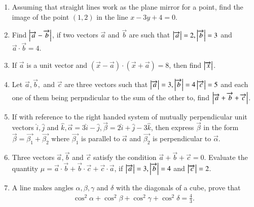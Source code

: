 \begin{enumerate}[label=\thesubsection.\arabic*,ref=\thesubsection.\theenumi]
\item Assuming that straight lines work as the plane mirror for a point, find the image of the point $(1,2)$ in the line $x-3y+4=0$.
\item Find $\left\vert\overrightarrow{a}-\overrightarrow{b}\right\vert$, if two vectors $\overrightarrow{a}$ and $\overrightarrow{b}$ are such that $\left\vert\overrightarrow{a}\right\vert=2, \left\vert\overrightarrow{b}\right\vert=3$ and $\overrightarrow{a} \cdot \overrightarrow{b}=4$.
\item If $\overrightarrow{a}$ is a unit vector and $(\overrightarrow{x}-\overrightarrow{a}) \cdot (\overrightarrow{x}+\overrightarrow{a})=8$, then find $\left\vert\overrightarrow{x}\right\vert$.
\item Let $\overrightarrow{a}, \overrightarrow{b},$ and $ \overrightarrow{c}$ are three vectors such that $\left\vert\overrightarrow{a}\right\vert=3, \left\vert\overrightarrow{b}\right\vert=4 \left\vert\overrightarrow{c}\right\vert=5$ and each one of them being perpndicular to the sum of the other to, find $\left\vert\overrightarrow{a}+\overrightarrow{b}+\overrightarrow{c}\right\vert$.
\item If with reference to the right handed system of mutually perpendicular unit vectors $\hat{i},\hat{j}$ and $\hat{k}, \overrightarrow{\alpha} = 3\hat{i} -\hat{j}, \overrightarrow{\beta}= 2\hat{i} +\hat{j} -3\hat{k}$, then express $\overrightarrow{\beta}$ in the form $\overrightarrow{\beta} = \overrightarrow{\beta_1} +\overrightarrow{\beta_2}$ where $\overrightarrow{\beta_1}$ is parallel to $\overrightarrow{\alpha}$ and $\overrightarrow{\beta_2}$ is perpendicular to $\overrightarrow{\alpha}$.
\item Three vectors $\overrightarrow{a}, \overrightarrow{b}$ and $\overrightarrow{c}$ satisfy the condition $\overrightarrow{a} +\overrightarrow{b} +\overrightarrow{c} =0$. Evaluate the quantity $\mu = \overrightarrow{a}\cdot \overrightarrow{b} +\overrightarrow{b} \cdot \overrightarrow{c} +\overrightarrow{c} \cdot \overrightarrow{a}$, if $\left\vert\overrightarrow{a}\right\vert=3, \left\vert\overrightarrow{b}\right\vert=4$ and $\left\vert\overrightarrow{c}\right\vert=2$. 
\item A line makes angles $\alpha, \beta, \gamma$ and $\delta$  with the diagonals of a cube, prove that 
\begin{align}
\cos^2\alpha +\cos^2\beta +\cos^2\gamma +\cos^2\delta = \frac{4}{3}.
\end{align}
\end{enumerate}
